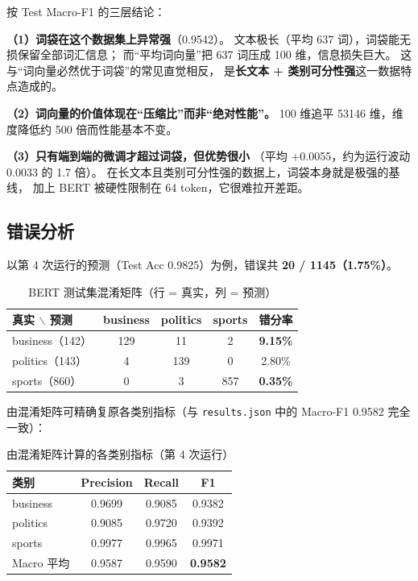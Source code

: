 \documentclass[12pt,a4paper]{ctexart}
\newcommand{\fpath}[1]{\texttt{#1}}
\newcommand{\best}[1]{\textbf{#1}}
\begin{document}
按 Test Macro-F1 的三层结论：

\textbf{（1）词袋在这个数据集上异常强}（0.9542）。
文本极长（平均 637 词），词袋能无损保留全部词汇信息；
而``平均词向量''把 637 词压成 100 维，信息损失巨大。
这与``词向量必然优于词袋''的常见直觉相反，
是\textbf{长文本 + 类别可分性强}这一数据特点造成的。

\textbf{（2）词向量的价值体现在``压缩比''而非``绝对性能''。}
100 维追平 53146 维，维度降低约 500 倍而性能基本不变。

\textbf{（3）只有端到端的微调才超过词袋，但优势很小}
（平均 +0.0055，约为运行波动 0.0033 的 1.7 倍）。
在长文本且类别可分性强的数据上，词袋本身就是极强的基线，
加上 BERT 被硬性限制在 64 token，它很难拉开差距。

\subsection{错误分析}
\label{sec:error}

以第 4 次运行的预测（Test Acc 0.9825）为例，错误共 \textbf{20 / 1145（1.75\%）}。

\begin{table}[htbp]
\centering
\small
\caption{BERT 测试集混淆矩阵（行 = 真实，列 = 预测）}
\label{tab:cm}
\begin{tabular}{lcccc}
\toprule
真实 $\backslash$ 预测 & business & politics & sports & 错分率 \\
\midrule
business（142） & 129 & 11 & 2 & \best{9.15\%} \\
politics（143） & 4 & 139 & 0 & 2.80\% \\
sports（860） & 0 & 3 & 857 & \best{0.35\%} \\
\bottomrule
\end{tabular}
\end{table}

由混淆矩阵可精确复原各类别指标（与 \fpath{results.json} 中的 Macro-F1 0.9582 完全一致）：

\begin{table}[htbp]
\centering
\small
\caption{由混淆矩阵计算的各类别指标（第 4 次运行）}
\label{tab:perclass}
\begin{tabular}{lccc}
\toprule
类别 & Precision & Recall & F1 \\
\midrule
business & 0.9699 & 0.9085 & 0.9382 \\
politics & 0.9085 & 0.9720 & 0.9392 \\
sports & 0.9977 & 0.9965 & 0.9971 \\
\midrule
Macro 平均 & 0.9587 & 0.9590 & \best{0.9582} \\
\bottomrule
\end{tabular}
\end{table}
\end{document}
